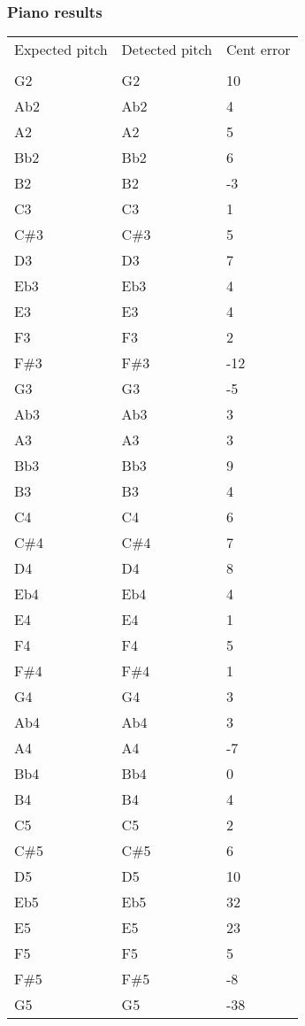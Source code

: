 \subsubsection{Piano results}
\begin{center}
	\begin{tabular}{| l | l | l |}
	\hline
	Expected pitch & Detected pitch & Cent error \\ \\ \hline
	G2  & G2  & 10  \\ \hline
	Ab2 & Ab2 & 4  \\ \hline
	A2  & A2  & 5  \\ \hline
	Bb2 & Bb2 & 6  \\ \hline
	B2  & B2  & -3  \\ \hline
	C3  & C3  & 1  \\ \hline
	C\#3 & C\#3 & 5  \\ \hline
	D3  & D3  & 7  \\ \hline
	Eb3 & Eb3 & 4  \\ \hline
	E3  & E3  & 4  \\ \hline
	F3  & F3  & 2  \\ \hline
	F\#3 & F\#3 & -12  \\ \hline
	G3  & G3  & -5  \\ \hline
	Ab3 & Ab3 & 3  \\ \hline
	A3  & A3  & 3  \\ \hline
	Bb3 & Bb3 & 9  \\ \hline
	B3  & B3  & 4  \\ \hline
	C4  & C4  & 6  \\ \hline
	C\#4 & C\#4 & 7  \\ \hline
	D4  & D4  & 8  \\ \hline
	Eb4 & Eb4 & 4  \\ \hline
	E4  & E4  & 1  \\ \hline
	F4  & F4  & 5  \\ \hline
	F\#4 & F\#4 & 1  \\ \hline
	G4  & G4  & 3  \\ \hline
	Ab4 & Ab4 & 3  \\ \hline
	A4  & A4  & -7  \\ \hline
	Bb4 & Bb4 & 0  \\ \hline
	B4  & B4  & 4  \\ \hline
	C5  & C5  & 2  \\ \hline
	C\#5 & C\#5 & 6  \\ \hline
	D5  & D5  & 10  \\ \hline
	Eb5 & Eb5 & 32  \\ \hline
	E5  & E5  & 23  \\ \hline
	F5  & F5  & 5  \\ \hline
	F\#5 & F\#5 & -8  \\ \hline
	G5  & G5  & -38  \\ \hline
	\end{tabular}
\end{center}

